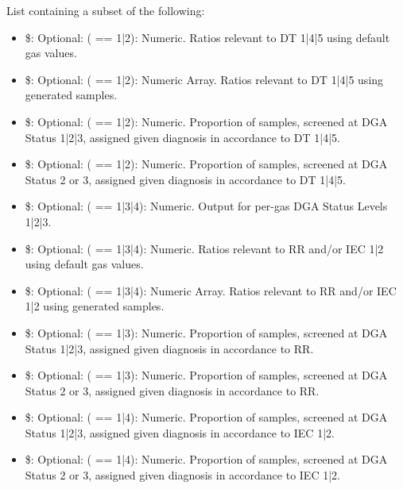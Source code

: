 \documentclass[a4paper]{book}
\begin{document}
\begin{Value}
List containing a subset of the following:
\begin{itemize}

\item{} \$: Optional: ( == 1|2): Numeric. Ratios relevant to DT 1|4|5 using default gas values.
\item{} \$: Optional: ( == 1|2): Numeric Array. Ratios relevant to DT 1|4|5 using generated samples.
\item{} \$: Optional: ( == 1|2): Numeric. Proportion of samples, screened at DGA Status 1|2|3, assigned given diagnosis in accordance to DT 1|4|5.
\item{} \$: Optional: ( == 1|2): Numeric. Proportion of samples, screened at DGA Status 2 or 3, assigned given diagnosis in accordance to DT 1|4|5.
\item{} \$: Optional: ( == 1|3|4): Numeric. Output for per-gas DGA Status Levels 1|2|3.
\item{} \$: Optional: ( == 1|3|4): Numeric. Ratios relevant to RR and/or IEC 1|2 using default gas values.
\item{} \$: Optional: ( == 1|3|4): Numeric Array. Ratios relevant to RR and/or IEC 1|2 using generated samples.
\item{} \$: Optional: ( == 1|3): Numeric. Proportion of samples, screened at DGA Status 1|2|3, assigned given diagnosis in accordance to RR.
\item{} \$: Optional: ( == 1|3): Numeric. Proportion of samples, screened at DGA Status 2 or 3, assigned given diagnosis in accordance to RR.
\item{} \$: Optional: ( == 1|4): Numeric. Proportion of samples, screened at DGA Status 1|2|3, assigned given diagnosis in accordance to IEC 1|2.
\item{} \$: Optional: ( == 1|4): Numeric. Proportion of samples, screened at DGA Status 2 or 3, assigned given diagnosis in accordance to IEC 1|2.

\end{itemize}

\end{Value}
%
\end{document}
